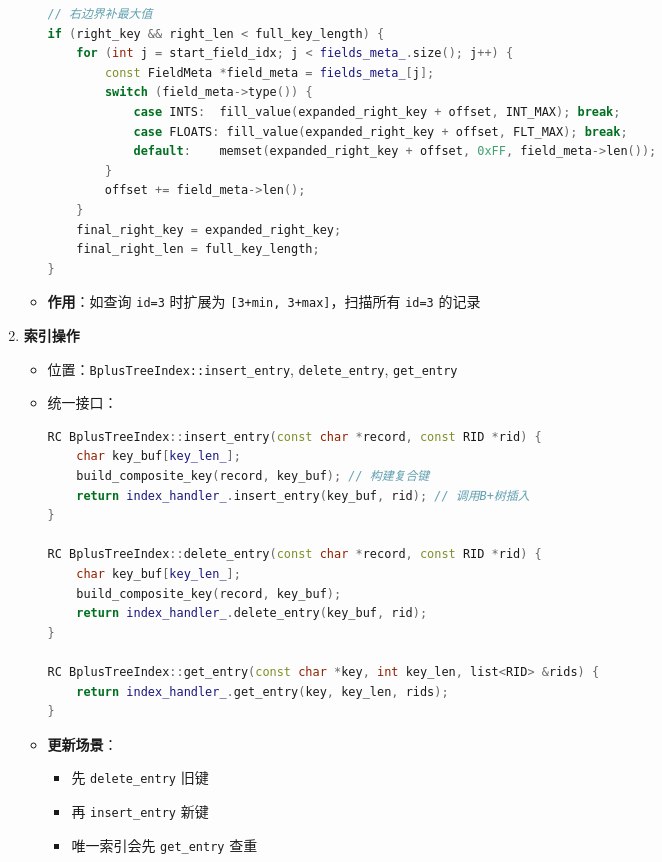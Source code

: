 \documentclass[a4paper, 12pt]{article}
\begin{document}
\begin{enumerate}
\begin{itemize}
\begin{lstlisting}[language=C++]
// 右边界补最大值
if (right_key && right_len < full_key_length) {
    for (int j = start_field_idx; j < fields_meta_.size(); j++) {
        const FieldMeta *field_meta = fields_meta_[j];
        switch (field_meta->type()) {
            case INTS:  fill_value(expanded_right_key + offset, INT_MAX); break;
            case FLOATS: fill_value(expanded_right_key + offset, FLT_MAX); break;
            default:    memset(expanded_right_key + offset, 0xFF, field_meta->len());
        }
        offset += field_meta->len();
    }
    final_right_key = expanded_right_key;
    final_right_len = full_key_length;
}
        \end{lstlisting}
        \item \textbf{作用}：如查询 \texttt{id=3} 时扩展为 \texttt{[3+min, 3+max]}，扫描所有 \texttt{id=3} 的记录
    \end{itemize}
    
    \item \textbf{索引操作}
    
\begin{itemize}
        \item 位置：\texttt{BplusTreeIndex::insert\_entry}, \texttt{delete\_entry}, \texttt{get\_entry}
        \item 统一接口：
        \begin{lstlisting}[language=C++]
RC BplusTreeIndex::insert_entry(const char *record, const RID *rid) {
    char key_buf[key_len_];
    build_composite_key(record, key_buf); // 构建复合键
    return index_handler_.insert_entry(key_buf, rid); // 调用B+树插入
}

RC BplusTreeIndex::delete_entry(const char *record, const RID *rid) {
    char key_buf[key_len_];
    build_composite_key(record, key_buf);
    return index_handler_.delete_entry(key_buf, rid);
}

RC BplusTreeIndex::get_entry(const char *key, int key_len, list<RID> &rids) {
    return index_handler_.get_entry(key, key_len, rids);
}
        \end{lstlisting}
        \item \textbf{更新场景}：
        
\begin{itemize}
            \item 先 \texttt{delete\_entry} 旧键
            \item 再 \texttt{insert\_entry} 新键
            \item 唯一索引会先 \texttt{get\_entry} 查重
        \end{itemize}
    \end{itemize}
\end{enumerate}
\end{document}
